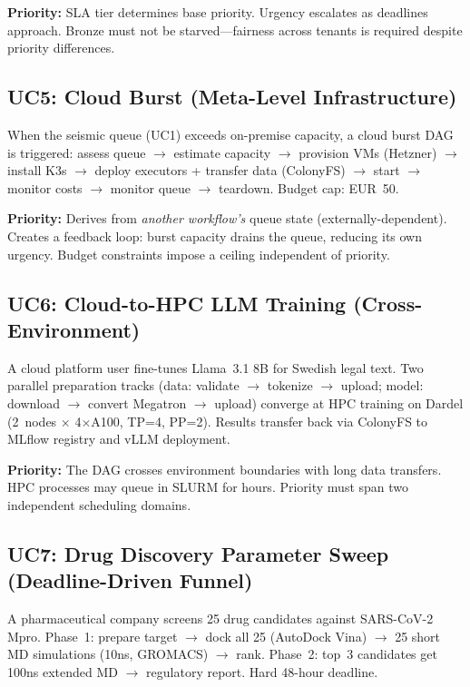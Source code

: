 \documentclass[conference]{IEEEtran}
\begin{document}
\textbf{Priority:} SLA tier determines base priority. Urgency escalates as deadlines approach. Bronze must not be starved---fairness across tenants is required despite priority differences.

\subsection{UC5: Cloud Burst (Meta-Level Infrastructure)}
\label{sec:uc5}

When the seismic queue (UC1) exceeds on-premise capacity, a cloud burst DAG is triggered: assess queue $\rightarrow$ estimate capacity $\rightarrow$ provision VMs (Hetzner) $\rightarrow$ install K3s $\rightarrow$ deploy executors + transfer data (ColonyFS) $\rightarrow$ start $\rightarrow$ monitor costs $\rightarrow$ monitor queue $\rightarrow$ teardown. Budget cap: EUR~50.

\textbf{Priority:} Derives from \emph{another workflow's} queue state (externally-dependent). Creates a feedback loop: burst capacity drains the queue, reducing its own urgency. Budget constraints impose a ceiling independent of priority.

\subsection{UC6: Cloud-to-HPC LLM Training (Cross-Environment)}
\label{sec:uc6}

A cloud platform user fine-tunes Llama~3.1 8B for Swedish legal text. Two parallel preparation tracks (data: validate $\rightarrow$ tokenize $\rightarrow$ upload; model: download $\rightarrow$ convert Megatron $\rightarrow$ upload) converge at HPC training on Dardel (2~nodes $\times$ 4$\times$A100, TP=4, PP=2). Results transfer back via ColonyFS to MLflow registry and vLLM deployment.

\textbf{Priority:} The DAG crosses environment boundaries with long data transfers. HPC processes may queue in SLURM for hours. Priority must span two independent scheduling domains.

\subsection{UC7: Drug Discovery Parameter Sweep (Deadline-Driven Funnel)}
\label{sec:uc7}

A pharmaceutical company screens 25 drug candidates against SARS-CoV-2 Mpro. Phase~1: prepare target $\rightarrow$ dock all 25 (AutoDock Vina) $\rightarrow$ 25 short MD simulations (10ns, GROMACS) $\rightarrow$ rank. Phase~2: top~3 candidates get 100ns extended MD $\rightarrow$ regulatory report. Hard 48-hour deadline.
\end{document}
